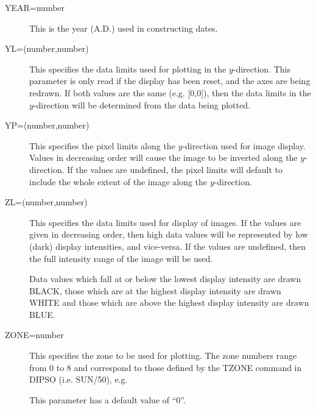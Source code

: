 \begin {description}
\item [YEAR=number]
This is the year (A.D.) used in constructing dates.

\item [YL=(number,number)]
This specifies the data limits used for plotting in the $y$-direction.
This parameter is only read if the display has been reset, and
the axes are being redrawn.
If both values are the same (e.g. [0,0]),
then the data limits in the $y$-direction will be determined from the
data being plotted.

\item [YP=(number,number)]
This specifies the pixel limits along the $y$-direction used for
image display.
Values in decreasing order will cause the image to be inverted
along the $y$-direction.
If the values are undefined, the pixel limits will default to include
the whole extent of the image along the $y$-direction. 

\item [ZL=(number,number)]
This specifies the data limits used for display of images.
If the values are given in decreasing order, then high data
values will be represented by low (dark) display intensities,
and vice-versa.
If the values are undefined, then the full intensity range of the
image will be used.

Data values which fall at or below the lowest display intensity are drawn
BLACK, those which are at the highest display intensity are drawn
WHITE and those which are above the highest display intensity are
drawn BLUE.

\item [ZONE=number]
This specifies the zone to be used for plotting.
The zone numbers range
from 0 to 8 and correspond to those defined by the TZONE command in 
DIPSO (i.e. SUN/50), e.g.

\begin {quote}
\end {quote}

This parameter has a default value of ``0''.

\end {description}
\newpage

